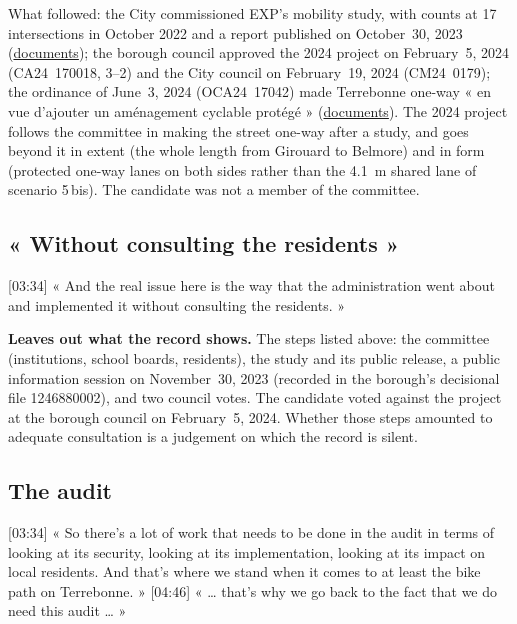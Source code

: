 \documentclass[11pt,letterpaper]{article}
\newcommand{\repourl}{https://github.com/OpenMobilityData/Terrebonne-open-sources}
\newcommand{\doc}[2]{\href{\repourl/blob/main/#1}{#2}}
\newcommand{\cliptime}[1]{\textsf{\small[#1]}}
\begin{document}
What followed: the City commissioned EXP's mobility study, with counts at 17
intersections in October 2022 and a report published on October~30, 2023
(\doc{2023-exp-mobility-study/}{documents}); the borough council approved the
2024 project on February~5, 2024 (CA24~170018, 3--2) and the City council on
February~19, 2024 (CM24~0179); the ordinance of June~3, 2024 (OCA24~17042)
made Terrebonne one-way « en vue d'ajouter un aménagement cyclable protégé »
(\doc{2024-project-approval/}{documents}). The 2024 project follows the
committee in making the street one-way after a study, and goes beyond it in
extent (the whole length from Girouard to Belmore) and in form (protected
one-way lanes on both sides rather than the 4.1~m shared lane of scenario
5\,bis). The candidate was not a member of the committee.

\subsection{« Without consulting the residents »}

\cliptime{03:34} « And the real issue here is the way that the administration
went about and implemented it without consulting the residents. »

\textbf{Leaves out what the record shows.} The steps listed above: the
committee (institutions, school boards, residents), the study and its public
release, a public information session on November~30, 2023 (recorded in the
borough's decisional file 1246880002), and two council votes. The candidate
voted against the project at the borough council on February~5, 2024. Whether
those steps amounted to adequate consultation is a judgement on which the
record is silent.

\subsection{The audit}

\cliptime{03:34} « So there's a lot of work that needs to be done in the audit
in terms of looking at its security, looking at its implementation, looking at
its impact on local residents. And that's where we stand when it comes to at
least the bike path on Terrebonne. » \cliptime{04:46} « … that's why we go
back to the fact that we do need this audit … »
\end{document}
